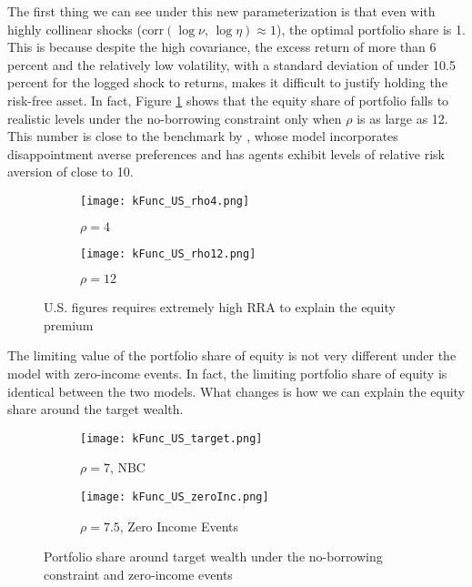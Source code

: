 The first thing we can see under this new parameterization is that even with highly collinear shocks ($\text{corr}(\log\nu,\,\log\eta) \approx 1$), the optimal portfolio share is 1. This is because despite the high covariance, the excess return of more than 6 percent and the relatively low volatility, with a standard deviation of under 10.5 percent for the logged shock to returns, makes it difficult to justify holding the risk-free asset. In fact, Figure \ref{fig:US_rho_comparison} shows that the equity share of portfolio falls to realistic levels under the no-borrowing constraint only when $\rho$ is as large as 12. This number is close to the benchmark by \citet{Schreindorfer2020}, whose model incorporates disappointment averse preferences and has agents exhibit levels of relative risk aversion of close to 10.

\begin{figure}[h]
    \centering
    \begin{subfigure}{0.49\textwidth}
        \centering
        \texttt{[image: kFunc\_US\_rho4.png]}
        \caption{$\rho = 4$}
    \end{subfigure}
    \begin{subfigure}{0.49\textwidth}
        \centering
        \texttt{[image: kFunc\_US\_rho12.png]}
        \caption{$\rho = 12$}
    \end{subfigure}
    \caption{U.S. figures requires extremely high RRA to explain the equity premium}
    \label{fig:US_rho_comparison}
\end{figure}

The limiting value of the portfolio share of equity is not very different under the model with zero-income events. In fact, the limiting portfolio share of equity is identical between the two models. What changes is how we can explain the equity share around the target wealth.

\begin{figure}[h]
    \centering
    \begin{subfigure}{0.49\textwidth}
        \centering
        \texttt{[image: kFunc\_US\_target.png]}
        \caption{$\rho = 7$, NBC}
    \end{subfigure}
    \begin{subfigure}{0.49\textwidth}
        \centering
        \texttt{[image: kFunc\_US\_zeroInc.png]}
        \caption{$\rho = 7.5$, Zero Income Events}
    \end{subfigure}
    \caption{Portfolio share around target wealth under the no-borrowing constraint and zero-income events}
    \label{fig:US_zeroInc_target}
\end{figure}

